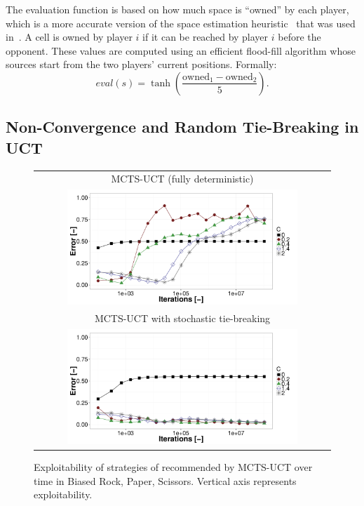The evaluation function is based on how much space is ``owned'' by each player, which is a more accurate version of the space estimation 
heuristic~\cite{DenTeuling12Tron} that was used in~\cite{Lanctot13Tron}. A cell is owned by player $i$ if it can be reached
by player $i$ before the opponent. These values are computed using an efficient flood-fill algorithm whose sources start from the two players' 
current positions. Formally: 
$$
eval(s) = \tanh\left(\frac{\textrm{owned}_1 - \textrm{owned}_2}{5}\right).
$$


\subsection{Non-Convergence and Random Tie-Breaking in UCT}\label{sec:exp:brps} 

\begin{figure}[t!]
\centering
\begin{tabular}{c}
{\small MCTS-UCT (fully deterministic)} \\
\includegraphics[width=0.8\textwidth]{figures/brps-MCTS-UCT.pdf} \\
{\small MCTS-UCT with stochastic tie-breaking} \\ 
\includegraphics[width=0.8\textwidth]{figures/brps-MCTS-UCT-NONDET.pdf} \\
\end{tabular}
\caption{Exploitability of strategies of recommended by MCTS-UCT over time in Biased Rock, Paper, Scissors. Vertical axis represents exploitability. }
\label{fig:expl-brps1}
\end{figure}

